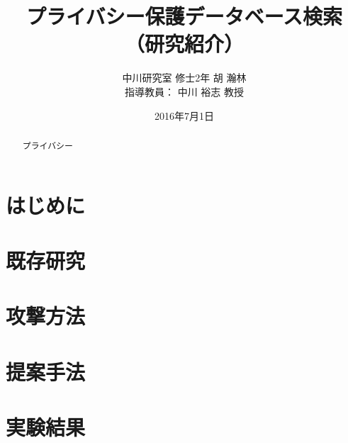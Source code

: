 \documentclass{jarticle}
\title{プライバシー保護データベース検索 \\（研究紹介）}
\author{中川研究室 修士2年 胡 瀚林\\指導教員： 中川 裕志 教授}
\date{2016年7月1日}
\theoremstyle{definition}
\begin{document}
\maketitle
\begin{abstract}
プライバシー
\end{abstract}

\section{はじめに}
\section{既存研究}
\section{攻撃方法}
\section{提案手法}
\section{実験結果}

\end{document}
